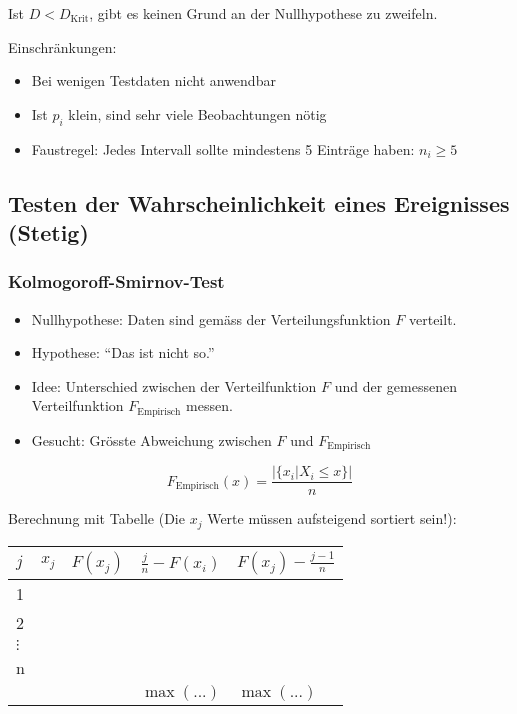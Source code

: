 Ist $D < D_{\text{Krit}}$, gibt es keinen Grund an der Nullhypothese zu
zweifeln.

Einschränkungen:
\begin{itemize}
  \item Bei wenigen Testdaten nicht anwendbar
  \item Ist $p_i$ klein, sind sehr viele Beobachtungen nötig
  \item Faustregel: Jedes Intervall sollte mindestens 5 Einträge haben:
    $n_i \geq 5$
\end{itemize}

\subsection{Testen der Wahrscheinlichkeit eines Ereignisses (Stetig)}
\subsubsection{Kolmogoroff-Smirnov-Test}
\begin{itemize}
  \item Nullhypothese: Daten sind gemäss der Verteilungsfunktion $F$
    verteilt.
  \item Hypothese: ``Das ist nicht so.''
  \item Idee: Unterschied zwischen der Verteilfunktion $F$
    und der gemessenen Verteilfunktion $F_{\text{Empirisch}}$ messen.
  \item Gesucht: Grösste Abweichung zwischen $F$ und $F_{\text{Empirisch}}$
\end{itemize}

\[ F_{\text{Empirisch}}(x) = \frac{|\{x_i | X_i \leq x\}|}{n} \]

Berechnung mit Tabelle (Die $x_j$ Werte müssen aufsteigend sortiert
sein!):

\begin{tabular}{|l|l|l|l|l|}
  \hline
  $j$        & $x_j$     & $F(x_j)$    & $\frac{j}{n}-F(x_i)$  & $F(x_j) - \frac{j-1}{n}$ \\
  \hline
  \hline
  1         &           &           &            &          \\
  2         &           &           &            &          \\
  $\vdots$  &           &           &            &          \\
  n         &           &           &            &          \\
  \hline
  \hline
          &           &  & $\operatorname{max}(...)$ & $\operatorname{max}(...)$ \\
  \hline
\end{tabular}


